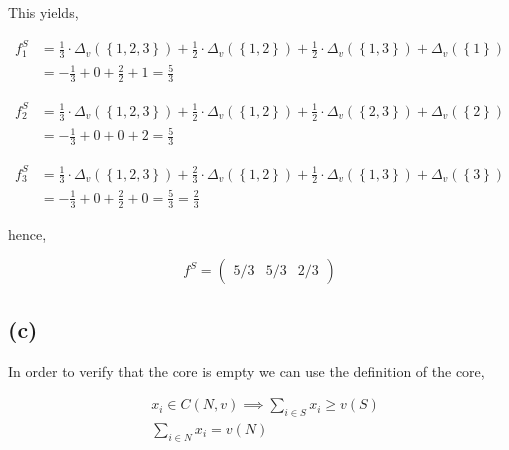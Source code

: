 \documentclass[american]{scrartcl}
\newcommand{\set}[1]{\left\{#1\right\}}
\begin{document}
This yields,

\begin{equation}
    \begin{split}
        f^S_1 &= \frac{1}{3} \cdot\Delta_v(\set{1,2,3}) + \frac{1}{2}\cdot \Delta_v(\set{1,2}) + \frac{1}{2}\cdot \Delta_v(\set{1,3}) + \Delta_v(\set{1}) \\
        &= - \frac{1}{3} + 0 + \frac{2}{2} + 1 =  \frac{5}{3}
    \end{split}
\end{equation}

\begin{equation}
    \begin{split}
        f^S_2 &= \frac{1}{3} \cdot\Delta_v(\set{1,2,3}) + \frac{1}{2}\cdot \Delta_v(\set{1,2}) + \frac{1}{2}\cdot \Delta_v(\set{2,3}) + \Delta_v(\set{2}) \\
        &= - \frac{1}{3} + 0 + 0 + 2 =  \frac{5}{3}
    \end{split}
\end{equation}

\begin{equation}
    \begin{split}
        f^S_3 &= \frac{1}{3} \cdot\Delta_v(\set{1,2,3}) + \frac{2}{3}\cdot \Delta_v(\set{1,2}) + \frac{1}{2}\cdot \Delta_v(\set{1,3}) + \Delta_v(\set{3}) \\
        &= - \frac{1}{3} + 0 + \frac{2}{2} + 0 =  \frac{5}{3} = \frac{2}{3}
    \end{split}
\end{equation}

hence,

\begin{equation*}
    f^S = \begin{pmatrix}
        5/3 & 5/3 & 2/3
    \end{pmatrix}
\end{equation*}

\subsection*{(c)}

In order to verify that the core is empty we can use the definition of the core,

\begin{equation*}
    \begin{split}
        &x_i \in C(N, v) \implies \sum_{i \in S} x_i \geq v(S) \\
        &\sum_{i \in N} x_i = v(N)
    \end{split}
\end{equation*}
\end{document}
